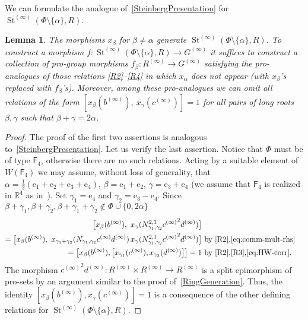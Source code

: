 \documentclass[oneside, 11pt]{amsart}
\numberwithin{equation}{section}
\newtheorem{lemma}{Lemma} \numberwithin{lemma}{section}
\theoremstyle{definition}
\theoremstyle{remark}
\DeclareMathOperator\St{St}
\newcommand{\rF}{\mathsf{F}}
\begin{document}
We can formulate the analogue of~\cref{SteinbergPresentation} for $\St^{(\infty)}(\Phi \setminus \{ \alpha \}, R)$.
\begin{lemma}\label{rem:xpma-presentation}
The morphisms $x_\beta$ for $\beta\neq \alpha$ generate $\St^{(\infty)}(\Phi\setminus\{\alpha\}, R)$. To construct a morphism $f \colon \St^{(\infty)}(\Phi\setminus\{\alpha\}, R) \to G^{(\infty)}$ it suffices to construct a collection of pro-group morphisms $f_\beta \colon R^{(\infty)} \to G^{(\infty)}$ satisfying the pro-analogues of those relations \eqref{R2}--\eqref{R4} in which $x_\alpha$ does not appear (with $x_\beta$'s replaced with $f_\beta$'s). Moreover, among these pro-analogues we can omit all relations of the form $[x_\beta(b^{(\infty)}),\ x_\gamma(c^{(\infty)})] = 1$ for all pairs of long roots \(\beta, \gamma\) such that \(\beta + \gamma = 2\alpha\).
\end{lemma}
\begin{proof}
The proof of the first two assertions is analogous to~\cref{SteinbergPresentation}. Let us verify the last assertion. Notice that \(\Phi\) must be of type $\rF_4$, otherwise there are no such relations. Acting by a suitable element of $W(\rF_4)$ we may assume, without loss of generality, that \(\alpha = \frac{1}{2}(\mathrm e_1 + \mathrm e_2 + \mathrm e_3 + \mathrm e_4)\), \(\beta = \mathrm e_1 + \mathrm e_2\), \(\gamma = \mathrm e_3 + \mathrm e_4\) (we assume that $\rF_4$ is realized in $\mathbb{R}^4$ as in~\cite[Ch.~VI,\S~4.9]{Bou81}). Set \(\gamma_1 = \mathrm e_4\) and \(\gamma_2 = \mathrm e_3 - \mathrm e_4\). Since \(\beta + \gamma_1, \beta + \gamma_2, \beta + \gamma_1 + \gamma_2 \notin \Phi \cup \{0, 2\alpha\}\)
\begin{align*}
\bigl[x_\beta(b^{(\infty)}),\ x_\gamma(N_{\gamma_1, \gamma_2}^{2, 1} {c^{(\infty)}}^2 d^{(\infty)})\bigr] \\ = \bigl[x_\beta(b^{(\infty)}),\ x_{\gamma_1 + \gamma_2}(N_{\gamma_1, \gamma_2} c^{(\infty)} d^{(\infty)})\, x_\gamma(N_{\gamma_1, \gamma_2}^{2, 1} {c^{(\infty)}}^2 d^{(\infty)})\bigr] & \text{ by~\eqref{R2},\eqref{eq:comm-mult-rhs}}\\
= \bigl[x_\beta(b^{(\infty)}), \bigl[x_{\gamma_1}(c^{(\infty)}), x_{\gamma_2}(d^{(\infty)})\bigr]\bigr] = 1 &\text{ by~\eqref{R2},\eqref{R3},\eqref{eq:HW-corr}}.
\end{align*}
The morphism ${c^{(\infty)}}^2 d^{(\infty)} \colon R^{(\infty)} \times R^{(\infty)} \to R^{(\infty)}$ is a split epimorphism of pro-sets by an argument similar to the proof of~\cref{RingGeneration}. Thus, the identity \([x_\beta(b^{(\infty)}), x_\gamma(c^{(\infty)})] = 1\) is a consequence of the other defining relations for $\St^{(\infty)}(\Phi\setminus\{\alpha\}, R)$.
\end{proof}
\end{document}
